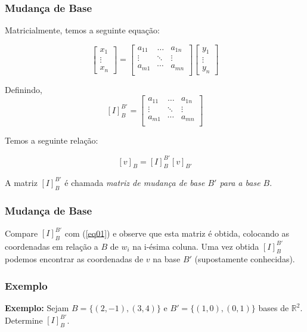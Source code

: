 \documentclass[hyperref={pdfpagelabels=false}]{beamer}
\begin{document}
\begin{frame}
	\frametitle{Mudança de Base}
	
	Matricialmente, temos a seguinte equação:
	
	$$\left[\begin{array}{c}
	x_{1} \\
	\vdots \\
	x_{n}
	\end{array}\right]
	=
	\left[ \begin{array}{ccc}
	a_{11}  &  \ldots  &  a_{1n} \\
	\vdots  &  \ddots  &  \vdots \\
	a_{m1}  &  \cdots  &  a_{mn} \\
	\end{array}\right]
	\left[\begin{array}{c}
	y_{1} \\
	\vdots \\
	y_{n}
	\end{array}\right]$$
	
	Definindo,
	$$[I]_{B}^{B'} = \left[ \begin{array}{ccc}
	a_{11}  &  \ldots  &  a_{1n} \\
	\vdots  &  \ddots  &  \vdots \\
	a_{m1}  &  \cdots  &  a_{mn} \\
	\end{array}\right]$$
	
	Temos a seguinte relação:
	
	$$[v]_{B} = [I]_{B}^{B'}[v]_{B'}$$
	
	A matriz $[I]_{B}^{B'}$ é chamada \emph{matriz de mudança de base $B'$ para a base $B$}.
	
\end{frame}

\begin{frame}
	\frametitle{Mudança de Base}
	
	Compare $[I]_{B}^{B'}$ com (\ref{eq01}) e observe que esta matriz é obtida, colocando as coordenadas em relação a $B$ de $w_i$ na i-ésima coluna. Uma vez obtida $[I]_{B}^{B'}$ podemos encontrar as coordenadas de $v$ na base $B'$ (supostamente conhecidas).
	
\end{frame}

\begin{frame}
	\frametitle{Exemplo}
	
	{\bf Exemplo:} Sejam $B = \{ (2,-1), (3,4) \}$ e $B' = \{ (1,0), (0,1) \}$ bases de $\mathbb{R}^2$. Determine $[I]_{B}^{B'}$.
	
\end{frame}
\end{document}
